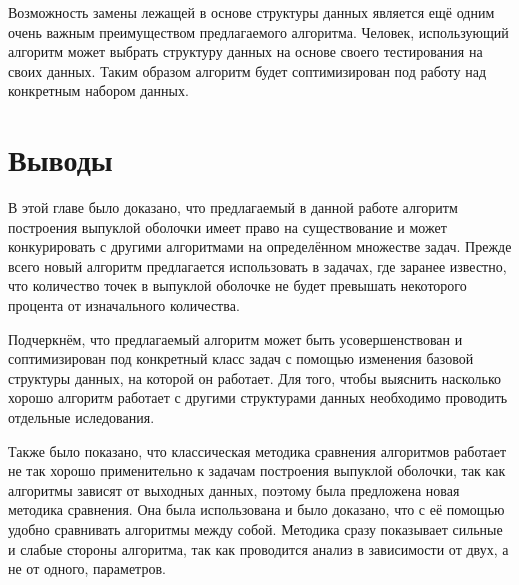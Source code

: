 Возможность замены лежащей в основе структуры данных является ещё одним очень важным преимуществом предлагаемого алгоритма. Человек, использующий алгоритм может выбрать структуру данных на основе своего тестирования на своих данных. Таким образом алгоритм будет соптимизирован под работу над конкретным набором данных.

\section{Выводы}

В этой главе было доказано, что предлагаемый в данной работе алгоритм построения выпуклой оболочки имеет право на существование и может конкурировать с другими алгоритмами на определённом множестве задач. Прежде всего новый алгоритм предлагается использовать в задачах, где заранее известно, что количество точек в выпуклой оболочке не будет превышать некоторого процента от изначального количества.

Подчеркнём, что предлагаемый алгоритм может быть усовершенствован и соптимизирован под конкретный класс задач с помощью изменения базовой структуры данных, на которой он работает. Для того, чтобы выяснить насколько хорошо алгоритм работает с другими структурами данных необходимо проводить отдельные иследования.

Также было показано, что классическая методика сравнения алгоритмов работает не так хорошо применительно к задачам построения выпуклой оболочки, так как алгоритмы зависят от выходных данных, поэтому была предложена новая методика сравнения. Она была использована и было доказано, что с её помощью удобно сравнивать алгоритмы между собой. Методика сразу показывает сильные и слабые стороны алгоритма, так как проводится анализ в зависимости от двух, а не от одного, параметров.
